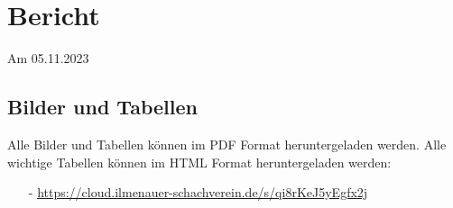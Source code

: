 \documentclass[a4paper,ngerman]{tui-algo-seminar}
\title{\inhalt}
\author{Erik Skopp}
\newcommand{\inhalt}{28. Magdeburger A-Open 2023}
\begin{document}
\maketitle
\thispagestyle{plain} %
\begin{abstract}
Bericht: \inhalt.\\
Das 
\end{abstract}

\section{Bericht}
Am 05.11.2023 

\subsection{Bilder und Tabellen}
Alle Bilder und Tabellen können im PDF Format heruntergeladen werden. Alle wichtige Tabellen können im HTML Format heruntergeladen werden: \\
\begin{itemize}
    \item[-] \hyperlink{https://cloud.ilmenauer-schachverein.de/s/qi8rKeJ5yEgfx2j}{https://cloud.ilmenauer-schachverein.de/s/qi8rKeJ5yEgfx2j}
\end{itemize}
\end{document}
